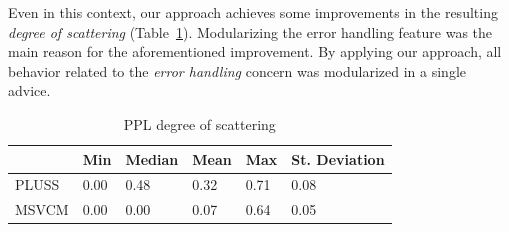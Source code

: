 \documentclass{sig-alt-full}
\begin{document}
Even in this context, our approach achieves some improvements in the
resulting \emph{degree of scattering} (Table~\ref{tab:ppl-dos}). Modularizing the error handling feature was the main reason for the
aforementioned improvement. By applying our approach, all behavior related to
the \emph{error handling} concern was modularized in a single advice. 

\begin{table}[htb] \centering
\caption{PPL degree of scattering}
\label{tab:ppl-dos}
\begin{small}
\begin{tabular}{llllll} \hline
					& Min 	& Median 	& Mean 	& Max 	& St. Deviation \\ \hline 
	PLUSS			& 0.00	& 0.48		& 0.32	& 0.71	& 0.08			\\
	MSVCM			& 0.00  & 0.00   	& 0.07 	& 0.64 	& 0.05			\\ \hline	
\end{tabular}
\end{small}
\end{table}







\end{document}
